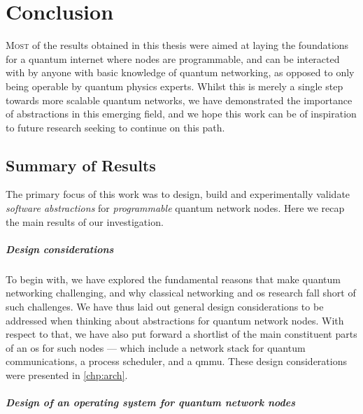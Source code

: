 \chapter{Conclusion}
\label{chp:conclusion}

\lettrine{M}{ost} of the results obtained in this thesis were aimed at laying the foundations for a
quantum internet where nodes are programmable, and can be interacted with by anyone with basic
knowledge of quantum networking, as opposed to only being operable by quantum physics experts.
Whilst this is merely a single step towards more scalable quantum networks, we have demonstrated the
importance of abstractions in this emerging field, and we hope this work can be of inspiration to
future research seeking to continue on this path.

\section{Summary of Results}

The primary focus of this work was to design, build and experimentally validate \emph{software
abstractions} for \emph{programmable} quantum network nodes. Here we recap the main results of our
investigation.

\paragraph{Design considerations}

To begin with, we have explored the fundamental reasons that make quantum networking challenging,
and why classical networking and \acrfull{os} research fall short of such challenges. We have thus
laid out general design considerations to be addressed when thinking about abstractions for quantum
network nodes. With respect to that, we have also put forward a shortlist of the main constituent
parts of an \acrshort{os} for such nodes --- which include a network stack for quantum
communications, a process scheduler, and a \acrlong{qmmu}. These design considerations were
presented in \cref{chp:arch}.

\paragraph{Design of an operating system for quantum network nodes}

